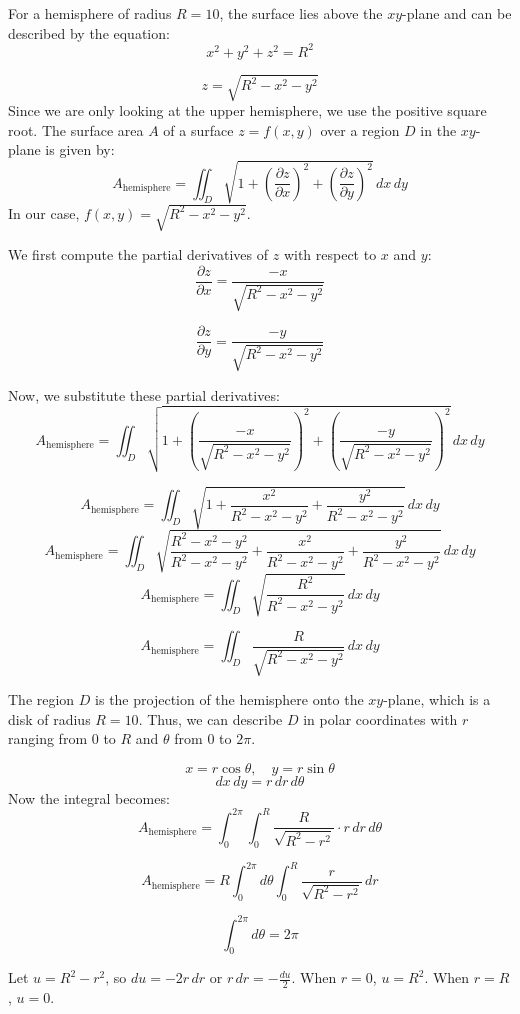 \documentclass{article}
\begin{document}
For a hemisphere of radius \( R = 10 \), the surface lies above the \( xy \)-plane and can be described by the equation:
\[
x^2 + y^2 + z^2 = R^2
\]

\[
z = \sqrt{R^2 - x^2 - y^2}
\]
Since we are only looking at the upper hemisphere, we use the positive square root.
The surface area \( A \) of a surface \( z = f(x, y) \) over a region \( D \) in the \( xy \)-plane is given by:
\[
A_{\text{hemisphere}} = \iint_D \sqrt{1 + \left( \frac{\partial z}{\partial x} \right)^2 + \left( \frac{\partial z}{\partial y} \right)^2} \, dx \, dy
\]
In our case, \( f(x, y) = \sqrt{R^2 - x^2 - y^2} \).

We first compute the partial derivatives of \( z \) with respect to \( x \) and \( y \):
\[
\frac{\partial z}{\partial x} = \frac{-x}{\sqrt{R^2 - x^2 - y^2}}
\]

\[
\frac{\partial z}{\partial y} = \frac{-y}{\sqrt{R^2 - x^2 - y^2}}
\]

Now, we substitute these partial derivatives:
\[
A_{\text{hemisphere}} = \iint_D \sqrt{1 + \left( \frac{-x}{\sqrt{R^2 - x^2 - y^2}} \right)^2 + \left( \frac{-y}{\sqrt{R^2 - x^2 - y^2}} \right)^2} \, dx \, dy
\]

\[
A_{\text{hemisphere}} = \iint_D \sqrt{1 + \frac{x^2}{R^2 - x^2 - y^2} + \frac{y^2}{R^2 - x^2 - y^2}} \, dx \, dy
\]
\[
A_{\text{hemisphere}} = \iint_D \sqrt{\frac{R^2 - x^2 - y^2}{R^2 - x^2 - y^2} + \frac{x^2}{R^2 - x^2 - y^2} + \frac{y^2}{R^2 - x^2 - y^2}} \, dx \, dy
\]
\[
A_{\text{hemisphere}} = \iint_D \sqrt{\frac{R^2}{R^2 - x^2 - y^2}} \, dx \, dy
\]

\[
A_{\text{hemisphere}} = \iint_D \frac{R}{\sqrt{R^2 - x^2 - y^2}} \, dx \, dy
\]


The region \( D \) is the projection of the hemisphere onto the \( xy \)-plane, which is a disk of radius \( R = 10 \). Thus, we can describe \( D \) in polar coordinates with \( r \) ranging from \( 0 \) to \( R \) and \( \theta \) from \( 0 \) to \( 2\pi \).

\[
x = r \cos \theta, \quad y = r \sin \theta
\]
\[
dx \, dy = r \, dr \, d\theta
\]
Now the integral becomes:
\[
A_{\text{hemisphere}} = \int_0^{2\pi} \int_0^{R} \frac{R}{\sqrt{R^2 - r^2}} \cdot r \, dr \, d\theta
\]

\[
A_{\text{hemisphere}} = R \int_0^{2\pi} d\theta \int_0^{R} \frac{r}{\sqrt{R^2 - r^2}} \, dr
\]

\[
\int_0^{2\pi} d\theta = 2\pi
\]


Let \( u = R^2 - r^2 \), so \( du = -2r \, dr \) or \( r \, dr = -\frac{du}{2} \).
When \( r = 0 \), \( u = R^2 \).
When \( r = R \), \( u = 0 \).
\end{document}
